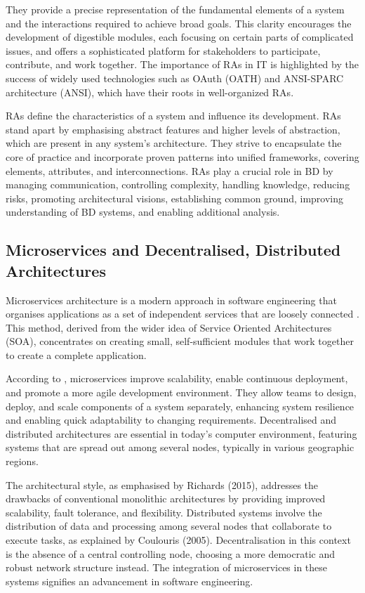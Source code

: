 \documentclass[journal]{IEEEtran}
\begin{document}
They provide a precise representation of the fundamental elements of a system and the interactions required to achieve broad goals. This clarity encourages the development of digestible modules, each focusing on certain parts of complicated issues, and offers a sophisticated platform for stakeholders to participate, contribute, and work together. The importance of RAs in IT is highlighted by the success of widely used technologies such as OAuth (OATH) and ANSI-SPARC architecture (ANSI), which have their roots in well-organized RAs. 

RAs define the characteristics of a system and influence its development. RAs stand apart by emphasising abstract features and higher levels of abstraction, which are present in any system's architecture. They strive to encapsulate the core of practice and incorporate proven patterns into unified frameworks, covering elements, attributes, and interconnections. RAs play a crucial role in BD by managing communication, controlling complexity, handling knowledge, reducing risks, promoting architectural visions, establishing common ground, improving understanding of BD systems, and enabling additional analysis. 

\subsection{Microservices and Decentralised, Distributed Architectures} 

Microservices architecture is a modern approach in software engineering that organises applications as a set of independent services that are loosely connected \cite{bucchiarone2020microservices}. This method, derived from the wider idea of Service Oriented Architectures (SOA), concentrates on creating small, self-sufficient modules that work together to create a complete application. 

According to \cite{newman2021building}, microservices improve scalability, enable continuous deployment, and promote a more agile development environment. They allow teams to design, deploy, and scale components of a system separately, enhancing system resilience and enabling quick adaptability to changing requirements. Decentralised and distributed architectures are essential in today's computer environment, featuring systems that are spread out among several nodes, typically in various geographic regions. 


The architectural style, as emphasised by Richards (2015), addresses the drawbacks of conventional monolithic architectures by providing improved scalability, fault tolerance, and flexibility. Distributed systems involve the distribution of data and processing among several nodes that collaborate to execute tasks, as explained by Coulouris (2005). Decentralisation in this context is the absence of a central controlling node, choosing a more democratic and robust network structure instead. The integration of microservices in these systems signifies an advancement in software engineering. 
\end{document}
